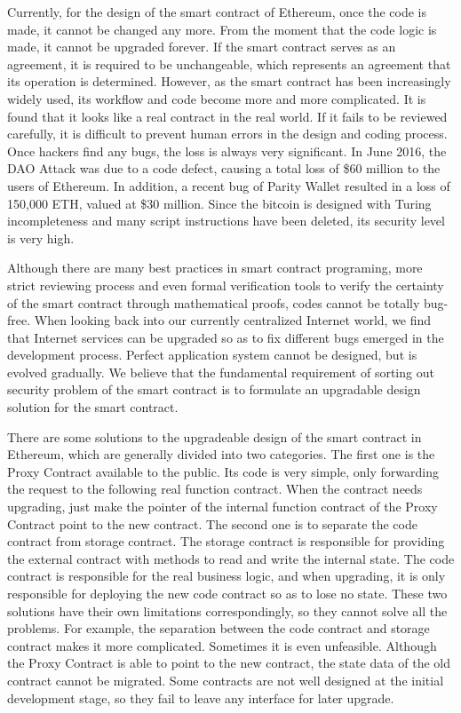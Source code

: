 Currently, for the design of the smart contract of Ethereum, once the code is made, it cannot be changed any more. From the moment that the code logic is made, it cannot be upgraded forever. If the smart contract serves as an agreement, it is required to be unchangeable, which represents an agreement that its operation is determined. However, as the smart contract has been increasingly widely used, its workflow and code become more and more complicated. It is found that it looks like a real contract in the real world. If it fails to be reviewed carefully, it is difficult to prevent human errors in the design and coding process. Once hackers find any bugs, the loss is always very significant. In June 2016, the DAO Attack was due to a code defect, causing a total loss of \$60 million to the users of Ethereum. In addition, a recent bug of Parity Wallet resulted in a loss of 150,000 ETH, valued at \$30 million. Since the bitcoin is designed with Turing incompleteness and many script instructions have been deleted, its security level is very high.

Although there are many best practices in smart contract programing, more strict reviewing process and even formal verification tools to verify the certainty of the smart contract through mathematical proofs, codes cannot be totally bug-free. When looking back into our currently centralized Internet world, we find that Internet services can be upgraded so as to fix different bugs emerged in the development process. Perfect application system cannot be designed, but is evolved gradually. We believe that the fundamental requirement of sorting out security problem of the smart contract is to formulate an upgradable design solution for the smart contract.

There are some solutions to the upgradeable design of the smart contract in Ethereum, which are generally divided into two categories. The first one is the Proxy Contract available to the public. Its code is very simple, only forwarding the request to the following real function contract. When the contract needs upgrading, just make the pointer of the internal function contract of the Proxy Contract point to the new contract. The second one is to separate the code contract from storage contract. The storage contract is responsible for providing the external contract with methods to read and write the internal state. The code contract is responsible for the real business logic, and when upgrading, it is only responsible for deploying the new code contract so as to lose no state. These two solutions have their own limitations correspondingly, so they cannot solve all the problems. For example, the separation between the code contract and storage contract makes it more complicated. Sometimes it is even unfeasible. Although the Proxy Contract is able to point to the new contract, the state data of the old contract cannot be migrated. Some contracts are not well designed at the initial development stage, so they fail to leave any interface for later upgrade.

